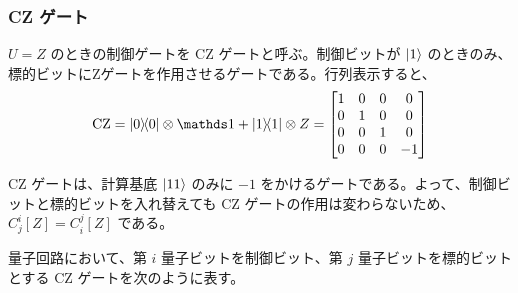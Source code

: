 \subsubsection{CZ ゲート}
$U = Z$ のときの制御ゲートを CZ ゲートと呼ぶ。制御ビットが $\ket{1}$ のときのみ、標的ビットにZゲートを作用させるゲートである。行列表示すると、
\begin{align}
    \CZ = \dyad{0}\ot \bbid + \dyad{1}\ot Z
    = \mqty[
        1 & 0 & 0 & 0 \\
        0 & 1 & 0 & 0 \\
        0 & 0 & 1 & 0 \\
        0 & 0 & 0 & -1
        ]
\end{align}

CZ ゲートは、計算基底 $\ket{11}$ のみに $-1$ をかけるゲートである。よって、制御ビットと標的ビットを入れ替えても CZ ゲートの作用は変わらないため、$C_j^i[Z] = C_i^j[Z]$ である。

量子回路において、第 $i$ 量子ビットを制御ビット、第 $j$ 量子ビットを標的ビットとする CZ ゲートを次のように表す。
\begin{figure}[H]
    \centering
\end{figure}


